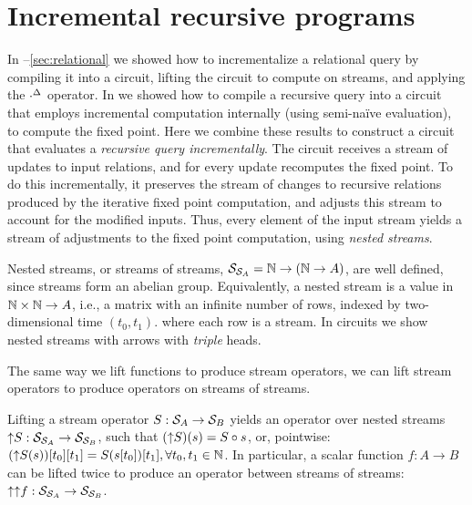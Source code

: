 \section{Incremental recursive programs}\label{sec:nested}

In --\ref{sec:relational}
we showed how to incrementalize a relational query by
compiling it into a circuit, lifting the circuit to compute on streams, and
applying the ${\cdot}^{\Delta}$ operator.  In  we showed
how to compile a recursive query into a circuit that employs incremental
computation internally (using semi-na\"ive evaluation), to compute the fixed point.
Here we combine these results to construct a circuit that evaluates a \emph{recursive
query incrementally}.  The circuit receives a stream of updates to input
relations, and for every update recomputes the fixed point.  To do this
incrementally, it preserves the stream of changes to recursive relations
produced by the iterative fixed point computation, and adjusts this stream to
account for the modified inputs.  Thus, every element of the input stream yields
a stream of adjustments to the fixed point computation, using
\emph{nested streams}.

Nested streams, or streams of streams, $\mathcal{S}_{\mathcal{S}_{A}} = \mathbb{N} \rightarrow (\mathbb{N}
\rightarrow A)$, are well defined, since streams form an abelian group.
Equivalently, a nested stream is a value in $\mathbb{N} \times \mathbb{N} \to A$, i.e., a matrix
with an infinite number of rows, indexed by two-dimensional time $(t_0, t_1)$.
where each row is a stream.  In circuits we show nested streams with
arrows with \emph{triple} heads.

The same way we lift functions to produce stream operators, we can
lift stream operators to produce operators on streams of streams.

Lifting a stream operator $S: \mathcal{S}_{A} \to \mathcal{S}_{B}$ yields an operator over
nested streams ${\uparrow}S: \mathcal{S}_{\mathcal{S}_{A}} \to \mathcal{S}_{\mathcal{S}_{B}}$, such
that $({\uparrow}S)(s) = S \circ s$, or, pointwise: $({\uparrow}S(s))[t_0][t_1] =
S(s[t_0])[t_1], \forall t_0, t_1 \in \mathbb{N}$.  In particular, a scalar function $f:
A \rightarrow B$ can be lifted twice to produce an operator between streams of
streams: ${\uparrow}{\uparrow}f: \mathcal{S}_{\mathcal{S}_{A}} \rightarrow \mathcal{S}_{\mathcal{S}_{B}}$.

\begin{center}
\end{center}

